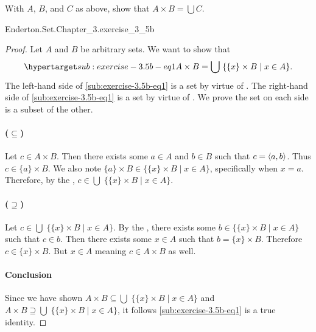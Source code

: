 \documentclass{report}
\begin{document}
  With $A$, $B$, and $C$ as above, show that $A \times B = \bigcup C$.

    {Enderton.Set.Chapter\_3.exercise\_3\_5b}

  \begin{proof}
    Let $A$ and $B$ be arbitrary sets.
    We want to show that
      \begin{equation}
        \hyperlabel{sub:exercise-3.5b-eq1}
        A \times B = \bigcup\; \{\{x\} \times B \mid x \in A\}.
      \end{equation}
    The left-hand side of \eqref{sub:exercise-3.5b-eq1} is a set by virtue of
      .
    The right-hand side of \eqref{sub:exercise-3.5b-eq1} is a set by virtue of
      .
    We prove the set on each side is a subset of the other.

    \paragraph{($\subseteq$)}%

      Let $c \in A \times B$.
      Then there exists some $a \in A$ and $b \in B$ such that
        $c = \left< a, b \right>$.
      Thus $c \in \{a\} \times B$.
      We also note $\{a\} \times B \in \{\{x\} \times B \mid x \in A\}$,
        specifically when $x = a$.
      Therefore, by the ,
        $c \in \bigcup\;\{\{x\} \times B \mid x \in A\}$.

    \paragraph{($\supseteq$)}%

      Let $c \in \bigcup\; \{\{x\} \times B \mid x \in A\}$.
      By the , there exists some
        $b \in \{\{x\} \times B \mid x \in A\}$ such that $c \in b$.
      Then there exists some $x \in A$ such that $b = \{x\} \times B$.
      Therefore $c \in \{x\} \times B$.
      But $x \in A$ meaning $c \in A \times B$ as well.

    \paragraph{Conclusion}%

      Since we have shown
        $A \times B \subseteq \bigcup\; \{\{x\} \times B \mid x \in A\}$ and
        $A \times B \supseteq \bigcup\; \{\{x\} \times B \mid x \in A\}$, it
        follows \eqref{sub:exercise-3.5b-eq1} is a true identity.

  \end{proof}
\end{document}
